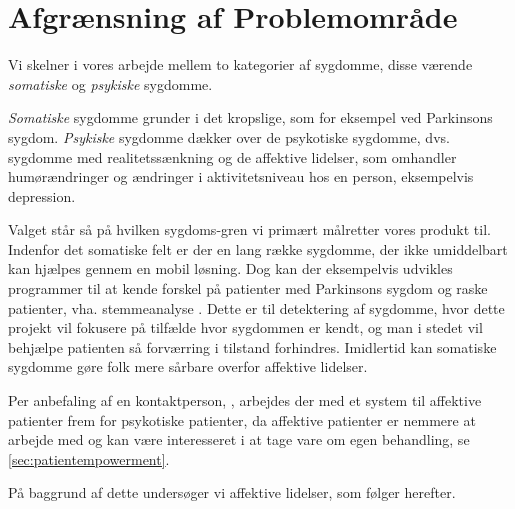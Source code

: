 \section{Afgrænsning af Problemområde}
Vi skelner i vores arbejde mellem to kategorier af sygdomme, disse værende \textit{somatiske} og \textit{psykiske} sygdomme.

\textit{Somatiske} sygdomme grunder i det kropslige, som for eksempel ved Parkinsons sygdom.
\textit{Psykiske} sygdomme dækker over de psykotiske sygdomme, dvs. sygdomme med realitetssænkning og de affektive lidelser, som omhandler humørændringer og ændringer i aktivitetsniveau hos en person, eksempelvis depression. \citep{misc:netpsykpsykose}

Valget står så på hvilken sygdoms-gren vi primært målretter vores produkt til.
Indenfor det somatiske felt er der en lang række sygdomme, der ikke umiddelbart kan hjælpes gennem en mobil løsning.
Dog kan der eksempelvis udvikles programmer til at kende forskel på patienter med Parkinsons sygdom og raske patienter, vha. stemmeanalyse \citep{6168572}.
Dette er til detektering af sygdomme, hvor dette projekt vil fokusere på tilfælde hvor sygdommen er kendt, og man i stedet vil behjælpe patienten så forværring i tilstand forhindres.
Imidlertid kan somatiske sygdomme gøre folk mere sårbare overfor affektive lidelser.

Per anbefaling af en kontaktperson, \citet{misc:janne-rasmussen}, arbejdes der med et system til affektive patienter frem for psykotiske patienter, da affektive patienter er nemmere at arbejde med og kan være interesseret i at tage vare om egen behandling, se \cref{sec:patientempowerment}.

På baggrund af dette undersøger vi affektive lidelser, som følger herefter.